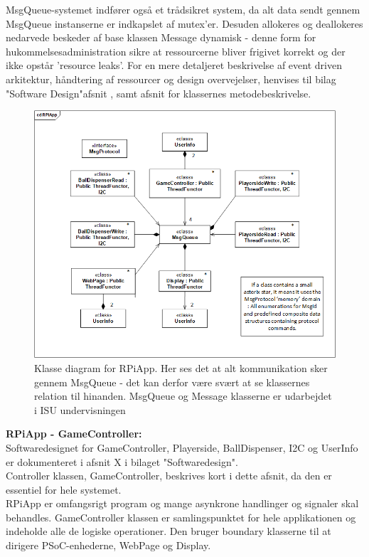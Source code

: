 \documentclass[Rapport/Rapport_main.tex]{subfiles}
\begin{document}
MsgQueue-systemet indfører også et trådsikret system, da alt data sendt gennem MsgQueue instanserne er indkapslet af mutex'er. Desuden allokeres og deallokeres nedarvede beskeder af base klassen Message dynamisk - denne form for hukommelsesadministration sikre at ressourcerne bliver frigivet korrekt og der ikke opstår 'resource leaks'. For en mere detaljeret beskrivelse af event driven arkitektur, håndtering af ressourcer og design overvejelser, henvises til bilag "Software Design"\space afsnit , samt afsnit  for klassernes metodebeskrivelse.
\begin{figure}[H]
    \centering
    \includegraphics[width=1\textwidth]{Rapport/RPi/graphics/cd_RPiApp.png}
    \caption{Klasse diagram for RPiApp. Her ses det at alt kommunikation sker gennem MsgQueue - det kan derfor være svært at se klassernes relation til hinanden. MsgQueue og Message klasserne er udarbejdet i ISU undervisningen\autocite{MSGQUEUE}}
   \label{fig:cd_GameController}
\end{figure}
\textbf{RPiApp - GameController:}\\
Softwaredesignet for GameController, Playerside, BallDispenser, I2C og UserInfo er dokumenteret i afsnit X i bilaget "Softwaredesign". \\
Controller klassen, GameController, beskrives kort i dette afsnit, da den er essentiel for hele systemet. \\
RPiApp er omfangsrigt program og mange asynkrone handlinger og signaler skal behandles. GameController klassen er samlingspunktet for hele applikationen og indeholde alle de logiske operationer. Den bruger boundary klasserne til at dirigere PSoC-enhederne, WebPage og Display. 
\end{document}

